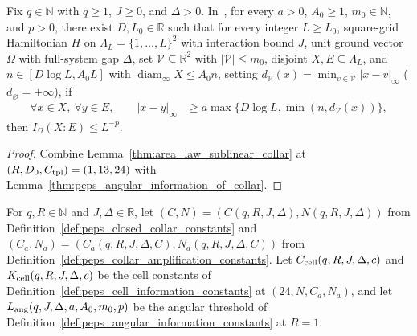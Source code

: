 \begin{theorem}
    \label{thm:peps_angular_information_from_gap}
    \leanok
    Fix $q\in\mathbb N$ with $q\ge1$, $J\ge0$, and $\Delta>0$.
    In~\cite[Proposition~3.4]{OpenAI2026PolynomialPEPS}, for every $a>0$, $A_0\ge1$, $m_0\in\mathbb N$, and $p>0$, there exist $D,L_0\in\mathbb R$ such that for every integer $L\ge L_0$, square-grid Hamiltonian $H$ on $\Lambda_L=\{1,\ldots,L\}^2$ with interaction bound $J$, unit ground vector $\Omega$ with full-system gap $\Delta$, set $\mathcal V\subseteq\mathbb R^2$ with $|\mathcal V|\le m_0$, disjoint $X,E\subseteq\Lambda_L$, and $n\in[D\log L,A_0L]$ with $\operatorname{diam}_\infty X\le A_0n$, setting $d_{\mathcal V}(x)=\min_{v\in\mathcal V}|x-v|_\infty$ ($d_{\varnothing}=+\infty$), if
    \begin{align}
        \forall x\in X,\ \forall y\in E,\qquad
        |x-y|_\infty & \ge a\max\{D\log L,\min(n,d_{\mathcal V}(x))\},
        \label{eq:peps_angular_sep_cond}
    \end{align}
    then $I_\Omega(X:E)\le L^{-p}$.
\end{theorem}
\begin{proof}\leanok
    Combine Lemma~\ref{thm:area_law_sublinear_collar} at $(R,D_0,C_{\rm tpl})=(1,13,24)$ with Lemma~\ref{thm:peps_angular_information_of_collar}.
\end{proof}

\begin{definition}
    \label{def:peps_closed_information_constants}
    \leanok
    For $q,R\in\mathbb N$ and $J,\Delta\in\mathbb R$, let $(C,N)=(C(q,R,J,\Delta),N(q,R,J,\Delta))$ from Definition~\ref{def:peps_closed_collar_constants} and $(C_a,N_a)=(C_a(q,R,J,\Delta,C),N_a(q,R,J,\Delta,C))$ from Definition~\ref{def:peps_collar_amplification_constants}. Let $C_{\rm cell}(q,R,J,\Delta,c)$ and $K_{\rm cell}(q,R,J,\Delta,c)$ be the cell constants of Definition~\ref{def:peps_cell_information_constants} at $(24,N,C_a,N_a)$, and let $L_{\rm ang}(q,J,\Delta,a,A_0,m_0,p)$ be the angular threshold of Definition~\ref{def:peps_angular_information_constants} at $R=1$.
\end{definition}

